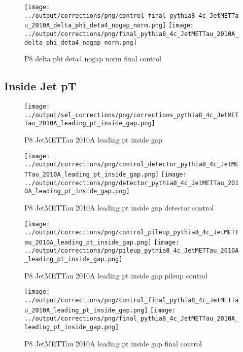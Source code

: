 \documentclass[11pt]{book}
\begin{document}
\begin{figure}[ht]
\centering
\texttt{[image: ../output/corrections/png/control\_final\_pythia8\_4c\_JetMETTau\_2010A\_delta\_phi\_deta4\_nogap\_norm.png]}
\texttt{[image: ../output/corrections/png/final\_pythia8\_4c\_JetMETTau\_2010A\_delta\_phi\_deta4\_nogap\_norm.png]}
\caption{P8 delta phi deta4 nogap norm final control}
\label{fig:p8_JetMETTau_2010A_delta_phi_deta4_nogap_norm_final_control}
\end{figure}

\clearpage
\subsection{Inside Jet pT}
\begin{figure}[ht]
\centering
\texttt{[image: ../output/sel\_corrections/png/corrections\_pythia8\_4c\_JetMETTau\_2010A\_leading\_pt\_inside\_gap.png]}
\caption{P8 JetMETTau 2010A leading pt inside gap}
\label{fig:p8_JetMETTau_2010A_leading_pt_inside_gap}
\end{figure}

\begin{figure}[ht]
\centering
\texttt{[image: ../output/corrections/png/control\_detector\_pythia8\_4c\_JetMETTau\_2010A\_leading\_pt\_inside\_gap.png]}
\texttt{[image: ../output/corrections/png/detector\_pythia8\_4c\_JetMETTau\_2010A\_leading\_pt\_inside\_gap.png]}
\caption{P8 JetMETTau 2010A leading pt inside gap detector control}
\label{fig:p8_JetMETTau_2010A_leading_pt_inside_gap_detector_control}
\end{figure}

\begin{figure}[ht]
\centering
\texttt{[image: ../output/corrections/png/control\_pileup\_pythia8\_4c\_JetMETTau\_2010A\_leading\_pt\_inside\_gap.png]}
\texttt{[image: ../output/corrections/png/pileup\_pythia8\_4c\_JetMETTau\_2010A\_leading\_pt\_inside\_gap.png]}
\caption{P8 JetMETTau 2010A leading pt inside gap pileup control}
\label{fig:p8_JetMETTau_2010A_leading_pt_inside_gap_pileup_control}
\end{figure}


\begin{figure}[ht]
\centering
\texttt{[image: ../output/corrections/png/control\_final\_pythia8\_4c\_JetMETTau\_2010A\_leading\_pt\_inside\_gap.png]}
\texttt{[image: ../output/corrections/png/final\_pythia8\_4c\_JetMETTau\_2010A\_leading\_pt\_inside\_gap.png]}
\caption{P8 JetMETTau 2010A leading pt inside gap final control}
\label{fig:p8_JetMETTau_2010A_leading_pt_inside_gap_final_control}
\end{figure}
\end{document}
